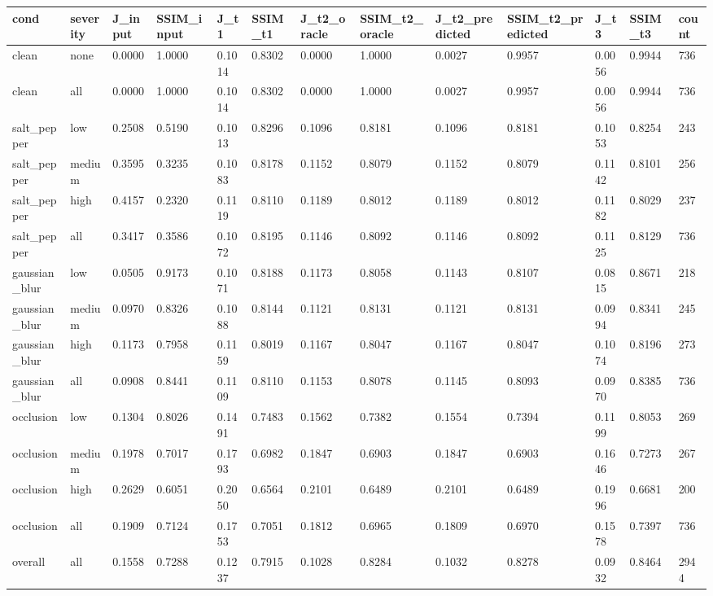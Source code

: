 \begin{tabular}{lllllllllllll}
\hline
cond & severity & J\_input & SSIM\_input & J\_t1 & SSIM\_t1 & J\_t2\_oracle & SSIM\_t2\_oracle & J\_t2\_predicted & SSIM\_t2\_predicted & J\_t3 & SSIM\_t3 & count \\
\hline
clean & none & 0.0000 & 1.0000 & 0.1014 & 0.8302 & 0.0000 & 1.0000 & 0.0027 & 0.9957 & 0.0056 & 0.9944 & 736 \\
clean & all & 0.0000 & 1.0000 & 0.1014 & 0.8302 & 0.0000 & 1.0000 & 0.0027 & 0.9957 & 0.0056 & 0.9944 & 736 \\
salt\_pepper & low & 0.2508 & 0.5190 & 0.1013 & 0.8296 & 0.1096 & 0.8181 & 0.1096 & 0.8181 & 0.1053 & 0.8254 & 243 \\
salt\_pepper & medium & 0.3595 & 0.3235 & 0.1083 & 0.8178 & 0.1152 & 0.8079 & 0.1152 & 0.8079 & 0.1142 & 0.8101 & 256 \\
salt\_pepper & high & 0.4157 & 0.2320 & 0.1119 & 0.8110 & 0.1189 & 0.8012 & 0.1189 & 0.8012 & 0.1182 & 0.8029 & 237 \\
salt\_pepper & all & 0.3417 & 0.3586 & 0.1072 & 0.8195 & 0.1146 & 0.8092 & 0.1146 & 0.8092 & 0.1125 & 0.8129 & 736 \\
gaussian\_blur & low & 0.0505 & 0.9173 & 0.1071 & 0.8188 & 0.1173 & 0.8058 & 0.1143 & 0.8107 & 0.0815 & 0.8671 & 218 \\
gaussian\_blur & medium & 0.0970 & 0.8326 & 0.1088 & 0.8144 & 0.1121 & 0.8131 & 0.1121 & 0.8131 & 0.0994 & 0.8341 & 245 \\
gaussian\_blur & high & 0.1173 & 0.7958 & 0.1159 & 0.8019 & 0.1167 & 0.8047 & 0.1167 & 0.8047 & 0.1074 & 0.8196 & 273 \\
gaussian\_blur & all & 0.0908 & 0.8441 & 0.1109 & 0.8110 & 0.1153 & 0.8078 & 0.1145 & 0.8093 & 0.0970 & 0.8385 & 736 \\
occlusion & low & 0.1304 & 0.8026 & 0.1491 & 0.7483 & 0.1562 & 0.7382 & 0.1554 & 0.7394 & 0.1199 & 0.8053 & 269 \\
occlusion & medium & 0.1978 & 0.7017 & 0.1793 & 0.6982 & 0.1847 & 0.6903 & 0.1847 & 0.6903 & 0.1646 & 0.7273 & 267 \\
occlusion & high & 0.2629 & 0.6051 & 0.2050 & 0.6564 & 0.2101 & 0.6489 & 0.2101 & 0.6489 & 0.1996 & 0.6681 & 200 \\
occlusion & all & 0.1909 & 0.7124 & 0.1753 & 0.7051 & 0.1812 & 0.6965 & 0.1809 & 0.6970 & 0.1578 & 0.7397 & 736 \\
overall & all & 0.1558 & 0.7288 & 0.1237 & 0.7915 & 0.1028 & 0.8284 & 0.1032 & 0.8278 & 0.0932 & 0.8464 & 2944 \\
\hline
\end{tabular}
